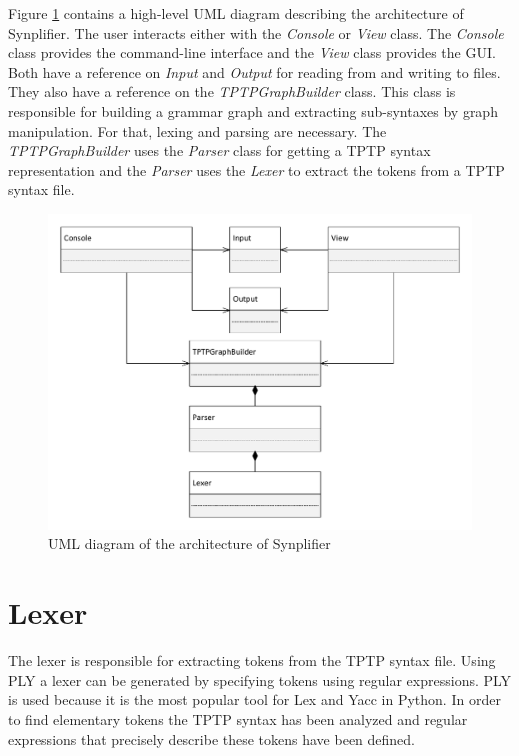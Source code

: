 Figure \ref{fig:ConceptArchitectureOverview} contains a high-level UML diagram describing the architecture of \ac{Synplifier}. The user interacts either with the \textit{Console} or \textit{View} class. The \textit{Console} class provides the command-line interface and the \textit{View} class provides the GUI. Both have a reference on \textit{Input} and \textit{Output} for reading from and writing to files. They also have a reference on the \textit{TPTPGraphBuilder} class. This class is responsible for building a grammar graph and extracting sub-syntaxes by graph manipulation. For that, lexing and parsing are necessary. The \textit{TPTPGraphBuilder} uses the \textit{Parser} class for getting a \ac{TPTP} syntax representation and the \textit{Parser} uses the \textit{Lexer} to extract the tokens from a \ac{TPTP} syntax file.
\begin{figure}[H]
\centering
\includegraphics[width=1\textwidth]{images/Concept_UML_Architecture_Overview.pdf}
\caption{UML diagram of the architecture of \ac{Synplifier}}
\label{fig:ConceptArchitectureOverview}
\end{figure}

\section{Lexer}\label{sec:ConceptLexer}
The lexer is responsible for extracting tokens from the \ac{TPTP} syntax file. Using \ac{PLY} a lexer can be generated by specifying tokens using regular expressions. \ac{PLY} is used because it is the most popular tool for Lex and Yacc in Python.
In order to find elementary tokens the \ac{TPTP} syntax has been analyzed and regular expressions that precisely describe these tokens have been defined.

